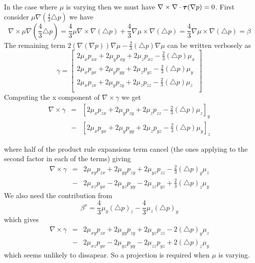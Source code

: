 \documentclass{article}
\renewcommand{\vec}[1]{\hbox{\boldmath $#1$}}
\begin{document}
In the case where $\mu$ is varying then we must have $\nabla\times\nabla\cdot\vec{\tau}(\nabla p)=0$.
First consider $\mu\nabla\left(\frac{4}{3}\triangle p \right)$ we have
$$\nabla\times \mu\nabla\left(\frac{4}{3}\triangle p \right)=
\frac{4}{3} \mu \nabla\times \nabla\left(\triangle p \right) + \frac{4}{3} \nabla\mu\times\nabla(\triangle p) =  \frac{4}{3} \nabla\mu\times\nabla(\triangle p)=\beta$$
The remaining term $2(\nabla(\nabla p))\nabla \mu - \frac{2}{3}(\triangle p)\nabla \mu$ can be written verbosely as
$$\gamma=
\left[ 
\begin{array}{c}
2\mu_x p_{xx} + 2\mu_y p_{xy} + 2\mu_z p_{xz}  - \frac{2}{3}(\triangle p)  \mu_x  \\
2\mu_x p_{yx} + 2\mu_y p_{yy} + 2\mu_z p_{yz} - \frac{2}{3}(\triangle p)  \mu_y \\
2\mu_x p_{zx} + 2\mu_y p_{zy} + 2\mu_z p_{zz} - \frac{2}{3}(\triangle p)  \mu_z \\
\end{array}
\right] 
$$
Computing the x component of $\nabla\times\gamma$ we get
\begin{eqnarray*}
\nabla\times\gamma &=& [2\mu_x p_{zx} + 2\mu_y p_{zy} + 2\mu_z p_{zz} - \frac{2}{3}(\triangle p)  \mu_z]_y \\ 
&-& [2\mu_x p_{yx} + 2\mu_y p_{yy} + 2\mu_z p_{yz} - \frac{2}{3}(\triangle p) \mu_y]_z
\end{eqnarray*}

where half of the product rule expansions term cancel (the ones applying to the second factor in each of the terms)
giving
\begin{eqnarray*}
\nabla\times\gamma &=& 
2\mu_{xy} p_{zx} + 2\mu_{yy} p_{zy} + 2\mu_{yz} p_{zz} - \frac{2}{3}(\triangle p)_y \mu_z \\ 
&-& 2\mu_{xz} p_{yx} - 2\mu_{yz} p_{yy} - 2\mu_{zz} p_{yz} + \frac{2}{3}(\triangle p)_z \mu_y
\end{eqnarray*}
We also need the contribution from 
$$\beta^x  = \frac{4}{3} \mu_y (\triangle p)_z - \frac{4}{3} \mu_z (\triangle p)_y $$
which gives
\begin{eqnarray*}
\nabla\times\gamma &=& 
2\mu_{xy} p_{zx} + 2\mu_{yy} p_{zy} + 2\mu_{yz} p_{zz} - 2(\triangle p)_y \mu_z \\ 
&-& 2\mu_{xz} p_{yx} - 2\mu_{yz} p_{yy} - 2\mu_{zz} p_{yz} + 2(\triangle p)_z \mu_y
\end{eqnarray*}
which seems unlikely to dissapear. So a projection is required when $\mu$ is varying.
\end{document}
